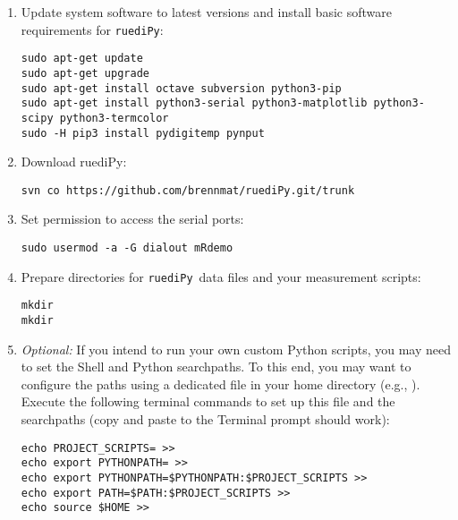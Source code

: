 \documentclass[12pt]{article}   	%
\newcommand{\ruediPy}{\texttt{ruediPy}}
\begin{document}
\begin{enumerate}

\item Update system software to latest versions and install basic software requirements for \ruediPy:\par
\texttt{sudo apt-get update}\\
\texttt{sudo apt-get upgrade}\\
\texttt{sudo apt-get install octave subversion python3-pip}\\
\texttt{sudo apt-get install python3-serial python3-matplotlib python3-scipy python3-termcolor}\\
\texttt{sudo -H pip3 install pydigitemp pynput}\\

\item Download ruediPy:\par
\texttt{svn co https://github.com/brennmat/ruediPy.git/trunk }


\item Set permission to access the serial ports:\par
\texttt{sudo usermod -a -G dialout mRdemo}

\item Prepare directories for \ruediPy\ data files and your measurement scripts:\par
\texttt{mkdir }\\
\texttt{mkdir }

\item \emph{Optional:} If you intend to run your own custom Python scripts, you may need to set the Shell and Python searchpaths. To this end, you may want to configure the paths using a dedicated file in your home directory (e.g., ). Execute the following terminal commands to set up this file and the searchpaths (copy and paste to the Terminal prompt should work):\par
{\scriptsize
\mbox{\texttt{echo PROJECT_SCRIPTS= >> }}\\[-1.5ex]
\mbox{\texttt{echo export PYTHONPATH= >> }}\\[-1.5ex]
\mbox{\texttt{echo export PYTHONPATH=\textsc{}\$PYTHONPATH\textsc{}:\textsc{}\$PROJECT_SCRIPTS\textsc{} >> }}\\[-1.5ex]
\mbox{\texttt{echo export PATH=\textsc{}\$PATH\textsc{}:\textsc{}\$PROJECT_SCRIPTS\textsc{} >> }}\\[-1.5ex]
\mbox{\texttt{echo source \textsc{}\$HOME\textsc{} >> }}
}


\end{enumerate}
\end{document}
